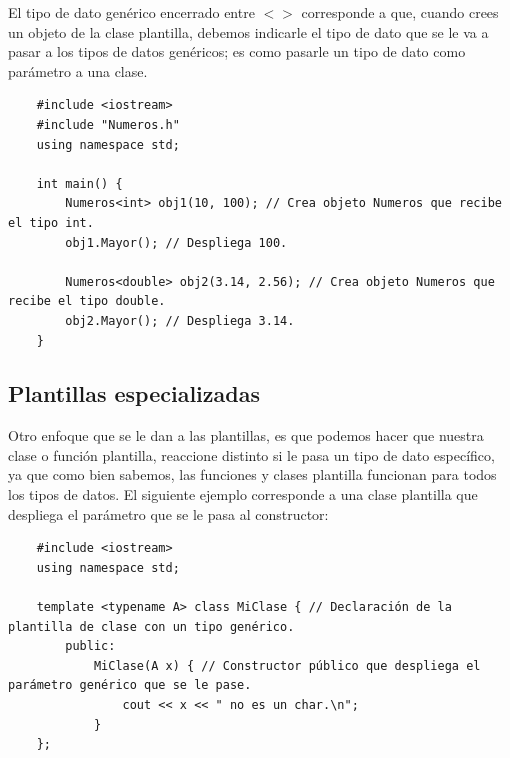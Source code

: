El tipo de dato genérico encerrado entre $<>$ corresponde a que, cuando crees un objeto de la clase plantilla, debemos indicarle el tipo de dato que se le va a pasar a los tipos de datos genéricos; es como pasarle un tipo de dato como parámetro a una clase.
\begin{lstlisting}
    #include <iostream>
    #include "Numeros.h"
    using namespace std;
    
    int main() {
        Numeros<int> obj1(10, 100); // Crea objeto Numeros que recibe el tipo int.
        obj1.Mayor(); // Despliega 100.
        
        Numeros<double> obj2(3.14, 2.56); // Crea objeto Numeros que recibe el tipo double.
        obj2.Mayor(); // Despliega 3.14.
    }
\end{lstlisting}


\subsection{Plantillas especializadas}
\hspace{0.55cm}Otro enfoque que se le dan a las plantillas, es que podemos hacer que nuestra clase o función plantilla, reaccione distinto si le pasa un tipo de dato específico, ya que como bien sabemos, las funciones y clases plantilla funcionan para todos los tipos de datos. El siguiente ejemplo corresponde a una clase plantilla que despliega el parámetro que se le pasa al constructor:
\begin{lstlisting}
    #include <iostream>
    using namespace std;
    
    template <typename A> class MiClase { // Declaración de la plantilla de clase con un tipo genérico.
        public:
            MiClase(A x) { // Constructor público que despliega el parámetro genérico que se le pase.
                cout << x << " no es un char.\n";
            }
    };
\end{lstlisting}

